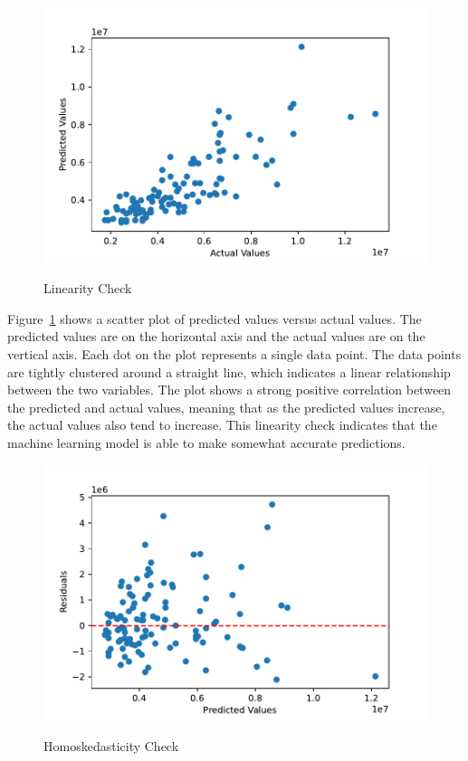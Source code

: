 \documentclass[12pt]{article}
\begin{document}
\begin{figure}[h!]
    \caption{Linearity Check}
    \includegraphics[width=1\textwidth]{linearity_check.pdf}
    \label{fig:linearity_check}
\end{figure}
Figure~\ref{fig:linearity_check} shows a scatter plot of predicted values versus actual values. The predicted values are on the horizontal axis and the actual values are on the vertical axis. Each dot on the plot represents a single data point. The data points are tightly clustered around a straight line, which indicates a linear relationship between the two variables. The plot shows a strong positive correlation between the predicted and actual values, meaning that as the predicted values increase, the actual values also tend to increase. This linearity check indicates that the machine learning model is able to make somewhat accurate predictions.

\begin{figure}[h!]
    \caption{Homoskedasticity Check}
    \includegraphics[width=1\textwidth]{homoskedasticity_check.pdf}
    \label{fig:homoskedasticity_check}
\end{figure}
\end{document}
